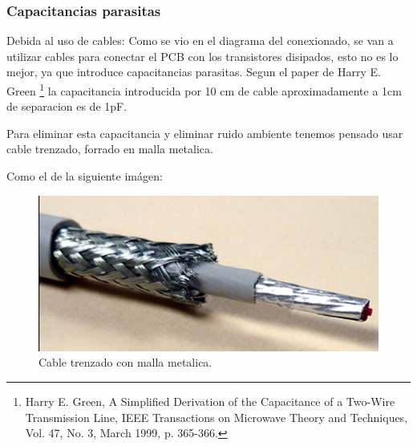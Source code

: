 \documentclass[a4paper,12pt,twoside]{article}
\begin{document}








\subsubsection{Capacitancias parasitas}

Debida al uso de cables:
\newline
\newline
Como se vio en el diagrama del conexionado, se van a utilizar cables para conectar el PCB con los transistores disipados, esto no es lo mejor, ya que introduce capacitancias parasitas. Segun el paper de Harry E. Green \footnote{Harry E. Green, A Simplified Derivation of the Capacitance of a Two-Wire Transmission Line, IEEE Transactions on Microwave Theory and Techniques, Vol. 47, No. 3, March 1999, p. 365-366.} la capacitancia introducida por 10 cm de cable aproximadamente a 1cm de separacion es de 1pF.

Para eliminar esta capacitancia y eliminar ruido ambiente tenemos pensado usar cable trenzado, forrado en malla metalica.

Como el de la siguiente imágen:

\begin{figure}[H]
    \centering
    \includegraphics[height=0.31415\textwidth]{img/cable_malla_trenzada.jpg}
    \caption{Cable trenzado con malla metalica.}
    \label{fig:cable_malla}
\end{figure}
\end{document}
